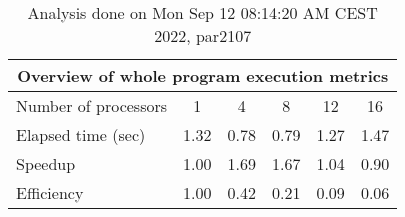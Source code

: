 \begin{table}[h]
\begin{center}
\begin{tabular}{|l|c|c|c|c|c|}
\hline
\multicolumn{6}{|c|}{Overview of whole program execution metrics} \\
\hline
\hline
Number of processors & 1 & 4 & 8 & 12 & 16 \\
\hline
Elapsed time (sec)      &       1.32 &       0.78 &       0.79 &       1.27 &       1.47 \\
\hline
Speedup                 &       1.00 &       1.69 &       1.67 &       1.04 &       0.90 \\
\hline
Efficiency              &       1.00 &       0.42 &       0.21 &       0.09 &       0.06 \\
\hline
\end{tabular}
\end{center}
\caption{ Analysis done on Mon Sep 12 08:14:20 AM CEST 2022, par2107}
\end{table}
